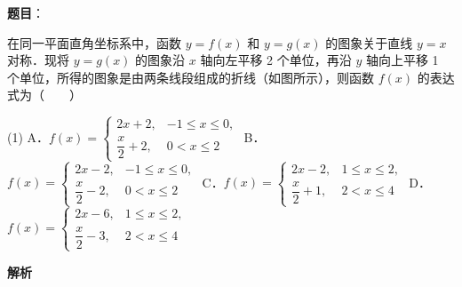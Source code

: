 \begin{answer}

\textbf{题目}：

在同一平面直角坐标系中，函数 $y = f(x)$ 和 $y = g(x)$ 的图象关于直线 $y = x$ 对称．现将 $y = g(x)$ 的图象沿 $x$ 轴向左平移 2 个单位，再沿 $y$ 轴向上平移 1 个单位，所得的图象是由两条线段组成的折线（如图所示），则函数 $f(x)$ 的表达式为\mbox{（　　）}
\nopagebreak[4]
\begin{center}\end{center}
\nopagebreak[4]
\begin{gkopts}(1)
\task A．$f(x) = \begin{cases} 2x + 2, & -1 \leqslant x \leqslant 0, \\ \dfrac{x}{2} + 2, & 0 < x \leqslant 2 \end{cases}$
\task B．$f(x) = \begin{cases} 2x - 2, & -1 \leqslant x \leqslant 0, \\ \dfrac{x}{2} - 2, & 0 < x \leqslant 2 \end{cases}$
\task C．$f(x) = \begin{cases} 2x - 2, & 1 \leqslant x \leqslant 2, \\ \dfrac{x}{2} + 1, & 2 < x \leqslant 4 \end{cases}$
\task D．$f(x) = \begin{cases} 2x - 6, & 1 \leqslant x \leqslant 2, \\ \dfrac{x}{2} - 3, & 2 < x \leqslant 4 \end{cases}$
\end{gkopts}

\textbf{解析}


\end{answer}
